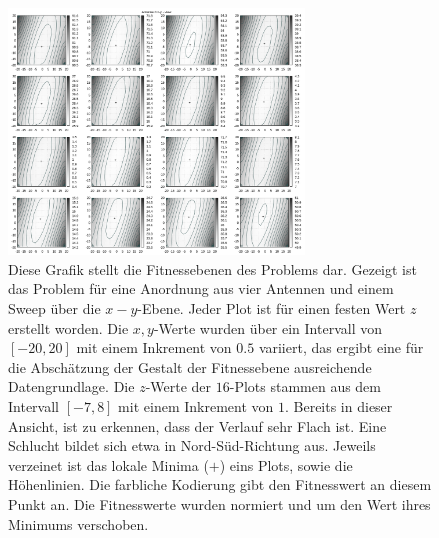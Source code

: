 %
\begin{figure}[ht!]
  \caption[Fitness Ebenen Heatmap]{Diese Grafik stellt die Fitnessebenen des Problems dar. Gezeigt ist das Problem für eine Anordnung aus vier Antennen und einem Sweep über die $x-y$-Ebene. Jeder Plot ist für einen festen Wert $z$ erstellt worden. Die $x, y$-Werte wurden über ein Intervall von $[-20,20]$ mit einem Inkrement von $0.5$ variiert, das ergibt eine für die Abschätzung der Gestalt der Fitnessebene ausreichende Datengrundlage. Die $z$-Werte der $16$-Plots stammen aus dem Intervall $[-7,8]$ mit einem Inkrement von $1$. Bereits in dieser Ansicht, ist zu erkennen, dass der Verlauf sehr Flach ist. Eine Schlucht bildet sich etwa in Nord-Süd-Richtung aus. Jeweils verzeinet ist das lokale Minima ($+$) eins Plots, sowie die Höhenlinien. Die farbliche Kodierung gibt den Fitnesswert an diesem Punkt an. Die Fitnesswerte wurden normiert und um den Wert ihres Minimums verschoben.}
  \begin{center}
    \includegraphics[width=0.7\textwidth]{img/fitness/xy_a0.png}
  \end{center}
  \label{fig:fitnessplane1-x-y-1}
%
\end{figure}

